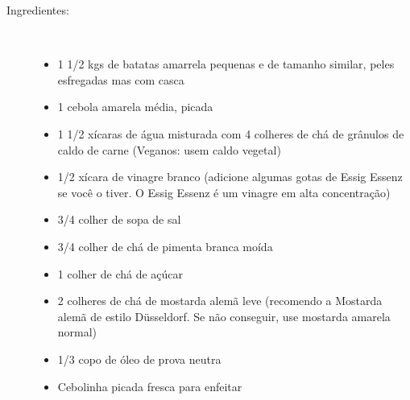 \documentclass [11pt, letterpaper] {article}
\begin{document}
\begin {description}

\item [Ingredientes:] \ \\
\begin {itemize}
\item 1 1/2 kgs de batatas amarrela pequenas e de tamanho similar,
peles esfregadas mas com casca
\item 1 cebola amarela média, picada
\item 1 1/2 xícaras de água misturada com 4 colheres de chá de grânulos de caldo de carne (Veganos: usem caldo vegetal)
\item 1/2 xícara de vinagre branco (adicione algumas gotas de Essig
Essenz se você o tiver. O Essig Essenz \'e um vinagre em alta concentra\c{c}\~ao)
\item 3/4 colher de sopa de sal
\item 3/4 colher de chá de pimenta branca moída
\item 1 colher de chá de açúcar
\item 2 colheres de chá de mostarda alemã leve (recomendo a Mostarda alemã de estilo Düsseldorf. Se não conseguir, use mostarda amarela normal)
\item 1/3 copo de óleo de prova neutra
\item Cebolinha picada fresca para enfeitar
\end {itemize}
\ \\


\end{description}
\end{document}
